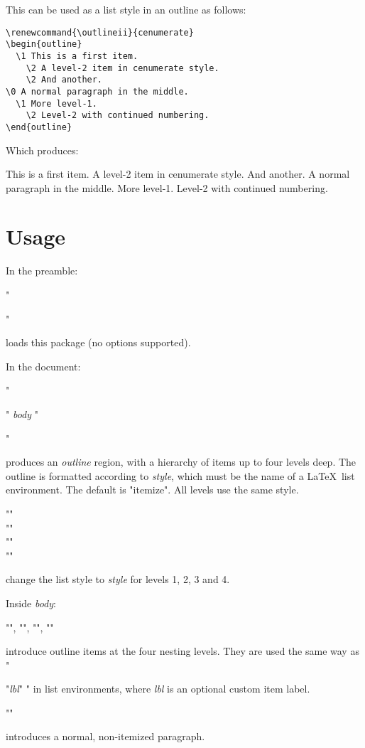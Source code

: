 \documentclass[11pt]{article}
\begin{document}
\noindent This can be used as a list style in an outline as follows:

{\small\begin{verbatim}
\renewcommand{\outlineii}{cenumerate}
\begin{outline}
  \1 This is a first item.  
    \2 A level-2 item in cenumerate style.
    \2 And another.
\0 A normal paragraph in the middle.
  \1 More level-1.
    \2 Level-2 with continued numbering.
\end{outline}
\end{verbatim}}

\noindent Which produces:

{\small
\renewcommand{\outlineii}{cenumerate}
\begin{outline}
  \1 This is a first item.  
    \2 A level-2 item in cenumerate style.
    \2 And another.
\0 A normal paragraph in the middle.
  \1 More level-1.
    \2 Level-2 with continued numbering.
\end{outline}
}

\section{Usage}

\begin{outline}

\0 In the preamble:

\1 "\usepackage{outlines}" 

loads this package (no options supported).

\0 In the document:

\1 "\begin{outline}" \emph{body} "\end{outline}" 

produces an \emph{outline} region, with a hierarchy of items up to four levels deep.  The outline is formatted according to \emph{style}, which must be the name of a \LaTeX\ list environment.  The default is "itemize".  All levels use the same style.

\1 "\renewcommand{\outlinei}{"\emph{style}"}" \\
	"\renewcommand{\outlineii}{"\emph{style}"}" \\
	"\renewcommand{\outlineiii}{"\emph{style}"}" \\
	"\renewcommand{\outlineiiii}{"\emph{style}"}"

change the list style to \emph{style} for levels 1, 2, 3 and 4.

\0 Inside \emph{body}:

\1 "", "", "",
""

introduce outline items at the four nesting levels.  They are
used the same way as "\item["\emph{lbl}"]" in list environments, where
\emph{lbl} is an optional custom item label.  

\1 "\0"

introduces a normal, non-itemized paragraph.

\end{outline}
\end{document}
